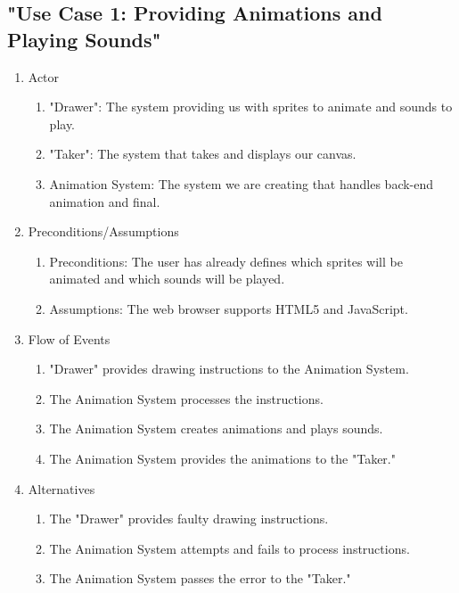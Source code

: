 \documentclass[12pt]{article}
\begin{document}
	\subsection{"Use Case 1: Providing Animations and Playing Sounds"}
\begin{enumerate}
  \item Actor
  \begin{enumerate}
  		\item "Drawer": The system providing us with sprites to animate and sounds to play.
   		 \item "Taker": The system that takes and displays our canvas.
		\item Animation System: The system we are creating that handles back-end animation and final.
  \end{enumerate}
  \item Preconditions/Assumptions
  \begin{enumerate}
   		 \item Preconditions: The user has already defines which sprites will be animated and which sounds will be played.
   		 \item Assumptions: The web browser supports HTML5 and JavaScript.
  \end{enumerate}
  \item Flow of Events
  \begin{enumerate}
   		 \item "Drawer" provides drawing instructions to the Animation System. 
   		 \item The Animation System processes the instructions.
		\item The Animation System creates animations and plays sounds.
		\item The Animation System provides the animations to the "Taker."
  \end{enumerate}
  \item Alternatives
  \begin{enumerate}
    		\item The "Drawer" provides faulty drawing instructions.
    		\item The Animation System attempts and fails to process instructions.
		\item The Animation System passes the error to the "Taker."
  \end{enumerate}
\end{enumerate}
\end{document}
